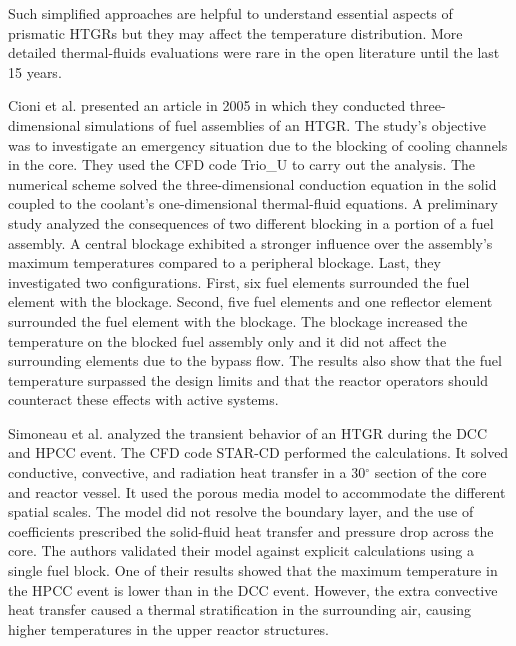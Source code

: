 Such simplified approaches are helpful to understand essential aspects of prismatic \glspl{HTGR} but they may affect the temperature distribution.
More detailed thermal-fluids evaluations were rare in the open literature until the last 15 years.

Cioni et al. \cite{cioni_3d_2005} presented an article in 2005 in which they conducted three-dimensional simulations of fuel assemblies of an \gls{HTGR}.
The study's objective was to investigate an emergency situation due to the blocking of cooling channels in the core.
They used the \gls{CFD} code Trio\_U \cite{bieder_priceles_2000} to carry out the analysis.
The numerical scheme solved the three-dimensional conduction equation in the solid coupled to the coolant's one-dimensional thermal-fluid equations.
A preliminary study analyzed the consequences of two different blocking in a portion of a fuel assembly.
A central blockage exhibited a stronger influence over the assembly's maximum temperatures compared to a peripheral blockage.
Last, they investigated two configurations.
First, six fuel elements surrounded the fuel element with the blockage.
Second, five fuel elements and one reflector element surrounded the fuel element with the blockage.
The blockage increased the temperature on the blocked fuel assembly only and it did not affect the surrounding elements due to the bypass flow.
The results also show that the fuel temperature surpassed the design limits and that the reactor operators should counteract these effects with active systems.

Simoneau et al. \cite{simoneau_three-dimensional_2007} analyzed the transient behavior of an \gls{HTGR} during the \gls{DCC} and \gls{HPCC} event.
The CFD code STAR-CD \cite{computational_dynamics_limited_star-cd_2004} performed the calculations.
It solved conductive, convective, and radiation heat transfer in a 30$^{\circ}$ section of the core and reactor vessel.
It used the porous media model to accommodate the different spatial scales.
The model did not resolve the boundary layer, and the use of coefficients prescribed the solid-fluid heat transfer and pressure drop across the core.
The authors validated their model against explicit calculations using a single fuel block.
One of their results showed that the maximum temperature in the \gls{HPCC} event is lower than in the \gls{DCC} event.
However, the extra convective heat transfer caused a thermal stratification in the surrounding air, causing higher temperatures in the upper reactor structures.

